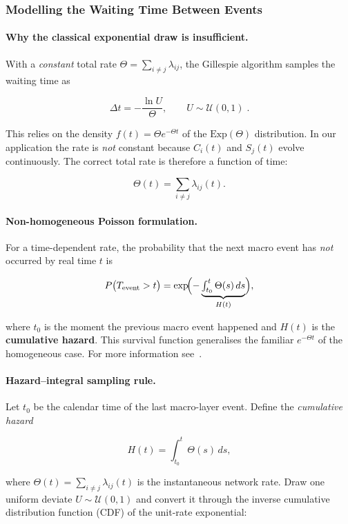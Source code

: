 \documentclass[
]{ceurart}
\newcommand{\Exp}{\mathrm{Exp}}
\begin{document}
\subsubsection{Modelling the Waiting Time Between Events}
\label{subsubsec:macro_waiting_time}

\paragraph{Why the classical exponential draw is insufficient.}
With a \emph{constant} total rate
\(\Theta=\sum_{i\neq j}\lambda_{ij}\),
the Gillespie algorithm samples the waiting time as

\[
  \Delta t = -\frac{\ln U}{\Theta},
  \qquad U\sim\mathcal U(0,1)\;.
\]

This relies on the density  
\(f(t)=\Theta e^{-\Theta t}\) of the \(\Exp(\Theta)\) distribution.
In our application the rate is \emph{not} constant because \(C_i(t)\) and
\(S_j(t)\) evolve continuously.  The correct total rate is therefore a
function of time:

\[
  \Theta(t)=\sum_{i\neq j}\lambda_{ij}(t).
\]

\paragraph{Non-homogeneous Poisson formulation.}
For a time-dependent rate, the probability that the next macro event
has \emph{not} occurred by real time \(t\) is

\[
  P\bigl(T_{\text{event}}>t\bigr)
  = \exp\!\Bigl(-\underbrace{\textstyle\int_{t_0}^{t}\Theta(s)\,ds}
                           _{H(t)}\Bigr),
\]

where \(t_0\) is the moment the previous macro event happened and
\(H(t)\) is the \textbf{cumulative hazard}.  This survival function
generalises the familiar \(e^{-\Theta t}\) of the homogeneous case. For more information see~\cite{vestergaard2015temporal}.

\paragraph{Hazard–integral sampling rule.}
Let \(t_0\) be the calendar time of the last macro-layer event.
Define the \emph{cumulative hazard}

\[
H(t)=\int_{t_0}^{t}\Theta(s)\,ds ,
\]

where \(\Theta(t)=\sum_{i\neq j}\lambda_{ij}(t)\) is the instantaneous
network rate.
Draw one uniform deviate \(U\sim\mathcal U(0,1)\) and convert it through
the inverse cumulative distribution function (CDF) of the unit-rate
exponential:
\end{document}

